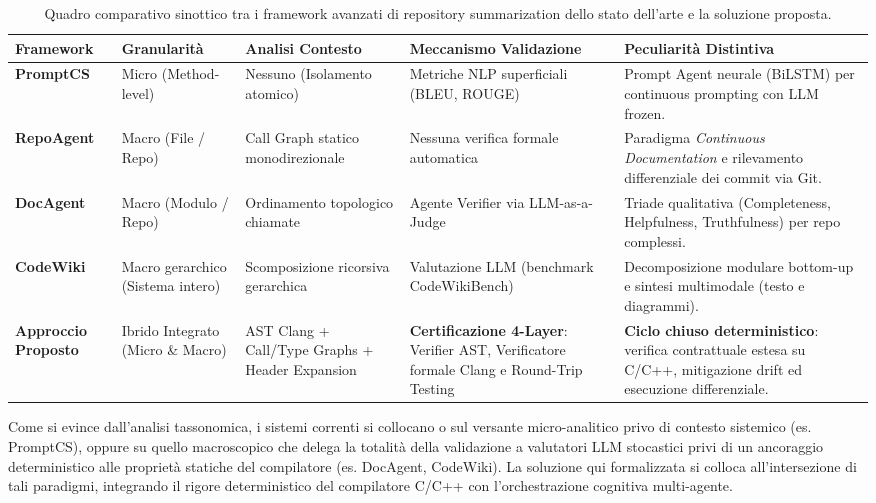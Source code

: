 \begin{table}[htbp]
\centering
\small
\caption{Quadro comparativo sinottico tra i framework avanzati di repository summarization dello stato dell'arte e la soluzione proposta.}
\label{tab:confronto_sota}
\begin{tabularx}{\textwidth}{l p{2.2cm} p{2.2cm} p{2.5cm} X}
\toprule
\textbf{Framework} & \textbf{Granularità} & \textbf{Analisi Contesto} & \textbf{Meccanismo Validazione} & \textbf{Peculiarità Distintiva} \\
\midrule
\textbf{PromptCS} \newline \cite{xu_prompt_2024} & Micro (Method-level) & Nessuno (Isolamento atomico) & Metriche NLP superficiali (BLEU, ROUGE) & Prompt Agent neurale (BiLSTM) per continuous prompting con LLM frozen. \\
\addlinespace
\textbf{RepoAgent} \newline \cite{luo_repoagent_2024} & Macro \newline (File / Repo) & Call Graph statico monodirezionale & Nessuna verifica formale automatica & Paradigma \emph{Continuous Documentation} e rilevamento differenziale dei commit via Git. \\
\addlinespace
\textbf{DocAgent} \newline \cite{yang_docagent_2025} & Macro \newline (Modulo / Repo) & Ordinamento topologico chiamate & Agente Verifier via LLM-as-a-Judge & Triade qualitativa (Completeness, Helpfulness, Truthfulness) per repo complessi. \\
\addlinespace
\textbf{CodeWiki} \newline \cite{hoang_codewiki_2026} & Macro gerarchico (Sistema intero) & Scomposizione ricorsiva gerarchica & Valutazione LLM (benchmark CodeWikiBench) & Decomposizione modulare bottom-up e sintesi multimodale (testo e diagrammi). \\
\addlinespace
\textbf{Approccio} \newline \textbf{Proposto} & Ibrido Integrato (Micro \& Macro) & AST Clang + Call/Type Graphs + Header Expansion & \textbf{Certificazione 4-Layer}: Verifier AST, Verificatore formale Clang e Round-Trip Testing & \textbf{Ciclo chiuso deterministico}: verifica contrattuale estesa su C/C++, mitigazione drift ed esecuzione differenziale. \\
\bottomrule
\end{tabularx}
\end{table}

Come si evince dall'analisi tassonomica, i sistemi correnti si collocano o sul versante micro-analitico privo di contesto sistemico (es. PromptCS), oppure su quello macroscopico che delega la totalità della validazione a valutatori LLM stocastici privi di un ancoraggio deterministico alle proprietà statiche del compilatore (es. DocAgent, CodeWiki). La soluzione qui formalizzata si colloca all'intersezione di tali paradigmi, integrando il rigore deterministico del compilatore C/C++ con l'orchestrazione cognitiva multi-agente.

